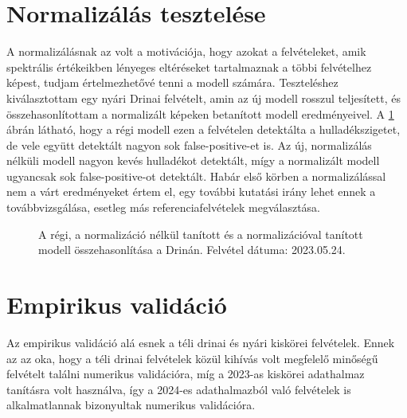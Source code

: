 \section{Normalizálás tesztelése}
\label{ch:normalization-test} 

A normalizálásnak az volt a motivációja, hogy azokat a felvételeket, amik spektrális értékeikben lényeges eltéréseket tartalmaznak a többi felvételhez képest, tudjam értelmezhetővé tenni a modell számára. Teszteléshez kiválasztottam egy nyári Drinai felvételt, amin az új modell rosszul teljesített, és összehasonlítottam a normalizált képeken betanított modell eredményeivel. A \ref{fig:normal-vs-normalized-vs-old} ábrán látható, hogy a régi modell ezen a felvételen detektálta a hulladékszigetet, de vele együtt detektált nagyon sok false-positive-et is. Az új, normalizálás nélküli modell nagyon kevés hulladékot detektált, mígy a normalizált modell ugyancsak sok false-positive-ot detektált. Habár első körben a normalizálással nem a várt eredményeket értem el, egy további kutatási irány lehet ennek a továbbvizsgálása, esetleg más referenciafelvételek megválasztása.

\begin{figure}[H]
	\centering
	\hspace{5pt}
	\hspace{5pt}
	\caption{A régi, a normalizáció nélkül tanított és a normalizációval tanított modell összehasonlítása a Drinán. Felvétel dátuma: 2023.05.24.}
	\label{fig:normal-vs-normalized-vs-old}
\end{figure}


\section{Empirikus validáció}
\label{ch:empirical-validation}
Az empirikus validáció alá esnek a téli drinai és nyári kiskörei felvételek. Ennek az az oka, hogy a téli drinai felvételek közül kihívás volt megfelelő minőségű felvételt találni numerikus validációra, míg a 2023-as kiskörei adathalmaz tanításra volt használva, így a 2024-es adathalmazból való felvételek is alkalmatlannak bizonyultak numerikus validációra. 

